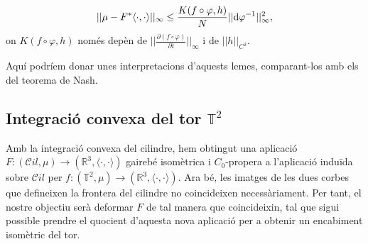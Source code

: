 \begin{lema}
    \label{lema:lema7}
    \begin{equation*}
        ||\mu-F^*\langle\cdot, \cdot\rangle||_\infty \le \frac{K(f\circ\varphi,h)}{N}||\textrm d\varphi ^{-1}||_\infty^2,
    \end{equation*}
    on $K(f\circ\varphi,h)$ només depèn de $||\frac{\partial(f\circ\varphi)}{\partial t}||_\infty$ i de $||h||_{C^2}$.
\end{lema}

{
\color{blue}
\begin{obs}
    Aquí podríem donar unes interpretacions d'aquests lemes, comparant-los amb els del teorema de Nash.
\end{obs}
}
    
\subsection{Integració convexa del tor $\mathbb T^2$}
Amb la integració convexa del cilindre, hem obtingut una aplicació $F:(\mathcal Cil, \mu)\to(\mathbb R^3, \langle\cdot, \cdot\rangle)$ gairebé isomètrica i $C_0$-propera a l'aplicació induïda sobre $\mathcal Cil$ per $f:(\mathbb T^2, \mu)\to(\mathbb R^3, \langle\cdot, \cdot\rangle)$. Ara bé, les imatges de les dues corbes que defineixen la frontera del cilindre no coincideixen necessàriament. Per tant, el nostre objectiu serà deformar $F$ de tal manera que coincideixin, tal que sigui possible prendre el quocient d'aquesta nova aplicació per a obtenir un encabiment isomètric del tor.

